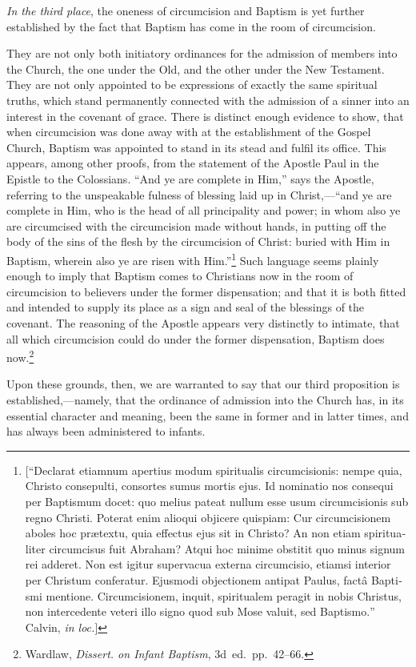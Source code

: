 \documentclass[
  english,
]{book}
\providecommand{\textlatin}{}
\renewcommand{\textlatin}[2][]{\foreignlanguage{latin}{#2}}
\begin{document}
\emph{In the third place}, the oneness of circumcision and Baptism is yet further established by the fact that Baptism has come in the room of circumcision.

They are not only both initiatory ordinances for the admission of members into the Church, the one under the Old, and the other under the New Testament. They are not only appointed to be expressions of exactly the same spiritual truths, which stand permanently connected with the admission of a sinner into an interest in the covenant of grace. There is distinct enough evidence to show, that when circumcision was done away with at the establishment of the Gospel Church, Baptism was appointed to stand in its stead and fulfil its office. This appears, among other proofs, from the statement of the Apostle Paul in the Epistle to the Colossians. ``And ye are complete in Him,'' says the Apostle, referring to the unspeakable fulness of blessing laid up in Christ,---``and ye are complete in Him, who is the head of all principality and power; in whom also ye are circumcised with the circumcision made without hands, in putting off the body of the sins of the flesh by the circumcision of Christ: buried with Him in Baptism, wherein also ye are risen with Him.''\footnote{{[}``\textlatin{Declarat etiamnum apertius modum spiritualis circumcisionis: nempe quia, Christo consepulti, consortes sumus mortis ejus. Id nominatio nos consequi per Baptismum docet: quo melius pateat nullum esse usum circumcisionis sub regno Christi. Poterat enim alioqui objicere quispiam: Cur circumcisionem aboles hoc prætextu, quia effectus ejus sit in Christo? An non etiam spiritualiter circumcisus fuit Abraham? Atqui hoc minime obstitit quo minus signum rei adderet. Non est igitur supervacua externa circumcisio, etiamsi interior per Christum conferatur. Ejusmodi objectionem antipat Paulus, factâ Baptismi mentione. Circumcisionem, inquit, spiritualem peragit in nobis Christus, non intercedente veteri illo signo quod sub Mose valuit, sed Baptismo.}'' Calvin, \emph{in loc.}{]}} Such language seems plainly enough to imply that Baptism comes to Christians now in the room of circumcision to believers under the former dispensation; and that it is both fitted and intended to supply its place as a sign and seal of the blessings of the covenant. The reasoning of the Apostle appears very distinctly to intimate, that all which circumcision could do under the former dispensation, Baptism does now.\footnote{Wardlaw, \emph{Dissert. on Infant Baptism}, 3d~ed.~pp.~42--66.}

Upon these grounds, then, we are warranted to say that our third proposition is established,---namely, that the ordinance of admission into the Church has, in its essential character and meaning, been the same in former and in latter times, and has always been administered to infants.
\end{document}
